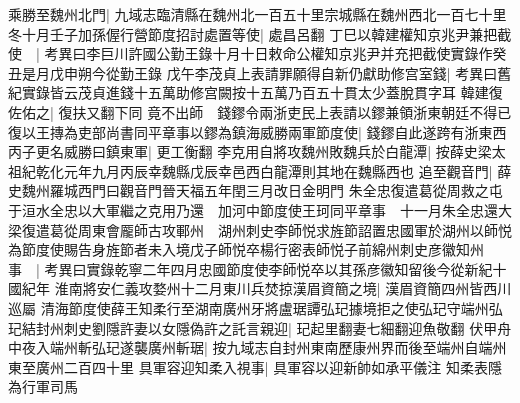 乘勝至魏州北門|{
	九域志臨清縣在魏州北一百五十里宗城縣在魏州西北一百七十里}
冬十月壬子加孫偓行營節度招討處置等使|{
	處昌呂翻}
丁巳以韓建權知京兆尹兼把截使　|{
	考異曰李巨川許國公勤王錄十月十日敕命公權知京兆尹并充把截使實錄作癸丑是月戊申朔今從勤王錄}
戊午李茂貞上表請罪願得自新仍獻助修宫室錢|{
	考異曰舊紀實錄皆云茂貞進錢十五萬助修宫闕按十五萬乃百五十貫太少蓋脫貫字耳}
韓建復佐佑之|{
	復扶又翻下同}
竟不出師　錢鏐令兩浙吏民上表請以鏐兼領浙東朝廷不得已復以王摶為吏部尚書同平章事以鏐為鎮海威勝兩軍節度使|{
	錢鏐自此遂跨有浙東西}
丙子更名威勝曰鎮東軍|{
	更工衡翻}
李克用自將攻魏州敗魏兵於白龍潭|{
	按薛史梁太祖紀乾化元年九月丙辰幸魏縣戊辰幸邑西白龍潭則其地在魏縣西也}
追至觀音門|{
	薛史魏州羅城西門曰觀音門晉天福五年閏三月改日金明門}
朱全忠復遣葛從周救之屯于洹水全忠以大軍繼之克用乃還　加河中節度使王珂同平章事　十一月朱全忠還大梁復遣葛從周東會龎師古攻鄆州　湖州刺史李師悦求旌節詔置忠國軍於湖州以師悦為節度使賜告身旌節者未入境戊子師悦卒楊行密表師悦子前綿州刺史彦徽知州事　|{
	考異曰實錄乾寧二年四月忠國節度使李師悦卒以其孫彦徽知留後今從新紀十國紀年}
淮南將安仁義攻婺州十二月東川兵焚掠漢眉資簡之境|{
	漢眉資簡四州皆西川巡屬}
清海節度使薛王知柔行至湖南廣州牙將盧琚譚弘玘據境拒之使弘玘守端州弘玘結封州刺史劉隱許妻以女隱偽許之託言親迎|{
	玘起里翻妻七細翻迎魚敬翻}
伏甲舟中夜入端州斬弘玘遂襲廣州斬琚|{
	按九域志自封州東南歷康州界而後至端州自端州東至廣州二百四十里}
具軍容迎知柔入視事|{
	具軍容以迎新帥如承平儀注}
知柔表隱為行軍司馬


